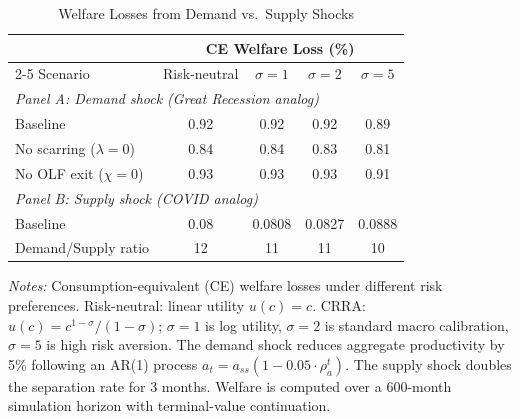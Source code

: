 \begin{table}[H]
\centering
\caption{Welfare Losses from Demand vs.\ Supply Shocks}
\begin{threeparttable}
\small
\begin{tabular}{lcccc}
\toprule
& \multicolumn{4}{c}{CE Welfare Loss (\%)} \\
\cmidrule(lr){2-5}
Scenario & Risk-neutral & $\sigma=1$ & $\sigma=2$ & $\sigma=5$ \\
\midrule
\multicolumn{5}{l}{\textit{Panel A: Demand shock (Great Recession analog)}} \\[3pt]
Baseline & 0.92 & 0.92 & 0.92 & 0.89 \\
No scarring ($\lambda = 0$) & 0.84 & 0.84 & 0.83 & 0.81 \\
No OLF exit ($\chi = 0$) & 0.93 & 0.93 & 0.93 & 0.91 \\
\midrule
\multicolumn{5}{l}{\textit{Panel B: Supply shock (COVID analog)}} \\[3pt]
Baseline & 0.08 & 0.0808 & 0.0827 & 0.0888 \\
\midrule
Demand/Supply ratio & 12 & 11 & 11 & 10 \\
\bottomrule
\end{tabular}
\begin{tablenotes}[flushleft]
\small
\item \textit{Notes:} Consumption-equivalent (CE) welfare losses under different risk preferences. Risk-neutral: linear utility $u(c) = c$. CRRA: $u(c) = c^{1-\sigma}/(1-\sigma)$; $\sigma = 1$ is log utility, $\sigma = 2$ is standard macro calibration, $\sigma = 5$ is high risk aversion. The demand shock reduces aggregate productivity by 5\% following an AR(1) process $a_t = a_{ss}(1 - 0.05 \cdot \rho_a^t)$. The supply shock doubles the separation rate for 3 months. Welfare is computed over a 600-month simulation horizon with terminal-value continuation.
\end{tablenotes}
\end{threeparttable}
\label{tab:welfare}
\end{table}
